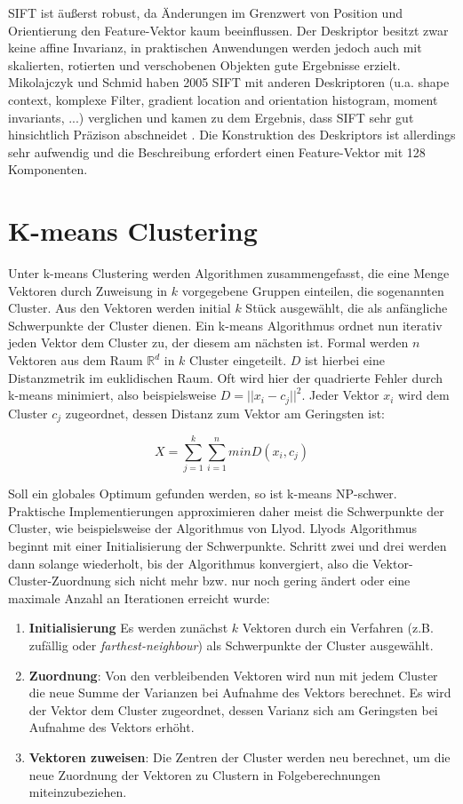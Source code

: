 SIFT ist äußerst robust, da Änderungen im Grenzwert von Position und Orientierung den Feature-Vektor kaum beeinflussen. Der Deskriptor besitzt zwar keine affine Invarianz, in praktischen Anwendungen werden jedoch auch mit skalierten, rotierten und verschobenen Objekten gute Ergebnisse erzielt. Mikolajczyk und Schmid haben 2005 SIFT mit anderen Deskriptoren (u.a. shape context, komplexe Filter, gradient location and orientation histogram, moment invariants, ...) verglichen und kamen zu dem Ergebnis, dass SIFT sehr gut hinsichtlich Präzison abschneidet \cite{idp2005}. Die Konstruktion des Deskriptors ist allerdings sehr aufwendig und die Beschreibung erfordert einen Feature-Vektor mit 128 Komponenten.

\section{K-means Clustering}

Unter k-means Clustering werden Algorithmen zusammengefasst, die eine Menge Vektoren durch Zuweisung in $k$ vorgegebene Gruppen einteilen, die sogenannten Cluster. Aus den Vektoren werden initial $k$ Stück ausgewählt, die als anfängliche Schwerpunkte der Cluster dienen. Ein k-means Algorithmus ordnet nun iterativ jeden Vektor dem Cluster zu, der diesem am nächsten ist. Formal werden $n$ Vektoren aus dem Raum $\mathbb{R}^{d}$ in $k$ Cluster eingeteilt. $D$ ist hierbei eine Distanzmetrik im euklidischen Raum. Oft wird hier der quadrierte Fehler durch k-means minimiert, also beispielsweise $D = ||x_{i} - c_{j}||^{2}$. Jeder Vektor $x_{i}$ wird dem Cluster $c_{j}$ zugeordnet, dessen Distanz zum Vektor am Geringsten ist:

$$ X = \sum_{j=1}^{k} \sum_{i=1}^{n} min D(x_{i}, c_{j}) $$

Soll ein globales Optimum gefunden werden, so ist k-means NP-schwer. Praktische Implementierungen approximieren daher meist die Schwerpunkte der Cluster, wie beispielsweise der Algorithmus von Llyod. Llyods Algorithmus beginnt mit einer Initialisierung der Schwerpunkte. Schritt zwei und drei werden dann solange wiederholt, bis der Algorithmus konvergiert, also die Vektor-Cluster-Zuordnung sich nicht mehr bzw. nur noch gering ändert oder eine maximale Anzahl an Iterationen erreicht wurde: 

\begin{enumerate}
	\item \textbf{Initialisierung} Es werden zunächst $k$ Vektoren durch ein Verfahren (z.B. zufällig oder \textit{farthest-neighbour}) als Schwerpunkte der Cluster ausgewählt.
	\item \textbf{Zuordnung}: Von den verbleibenden Vektoren wird nun mit jedem Cluster die neue Summe der Varianzen bei Aufnahme des Vektors berechnet. Es wird der Vektor dem Cluster zugeordnet, dessen Varianz sich am Geringsten bei Aufnahme des Vektors erhöht.
	\item \textbf{Vektoren zuweisen}: Die Zentren der Cluster werden neu berechnet, um die neue Zuordnung der Vektoren zu Clustern in Folgeberechnungen miteinzubeziehen.
\end{enumerate}

